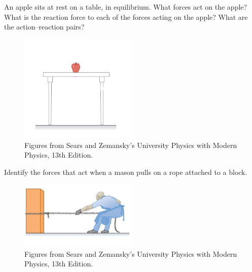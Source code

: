 \documentclass[]{beamer}
\begin{document}
    \begin{frame}
      An apple sits at rest on a table, in equilibrium. What forces act on
      the apple? What is the reaction force to each of the forces acting on
      the apple? What are the action–reaction pairs?
      \vspace{5mm}
    

      \begin{figure}[h!]  
        \includegraphics[width=0.5\textwidth]{images/f12.jpg}
        \caption{ {\tiny Figures from Sears and Zemansky's University Physics 
        with Modern Physics, 13th Edition.} }
      \end{figure}

      \end{frame}











    

    \begin{frame}
      Identify the forces that act when a mason pulls on a rope attached to a block.
      \vspace{5mm}
    

      \begin{figure}[h!]  
        \includegraphics[width=0.5\textwidth]{images/f13.jpg}
        \caption{ {\tiny Figures from Sears and Zemansky's University Physics 
        with Modern Physics, 13th Edition.} }
      \end{figure}

      \end{frame}
\end{document}
